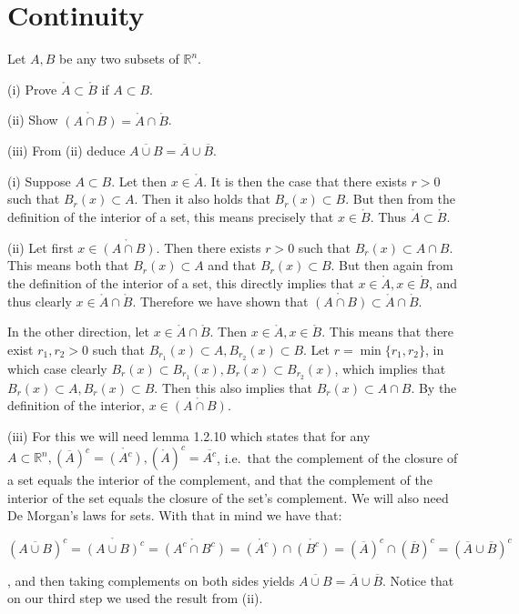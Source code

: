 \chapter{Continuity}

\begin{exercise}{6}
    Let $A, B$ be any two subsets of $\mathbb{R}^n$.

    (i) Prove $\mathring{A} \subset \mathring{B}$ if $A \subset B$.

    (ii) Show $\mathring{(A\cap B)} = \mathring{A} \cap \mathring{B}$.

    (iii) From (ii) deduce $\overline{A \cup B} = \overline{A} \cup \overline{B}$.
\end{exercise}

\begin{solution}

    (i) Suppose $A \subset B$. Let then $x \in \mathring{A}$. It is then the case that there exists $r > 0$ such that $B_r(x) \subset A$. Then it also holds that $B_r(x) \subset B$. But then from the definition of the interior of a set, this means precisely that $x \in \mathring{B}$. Thus $\mathring{A} \subset \mathring{B}$.

    (ii) Let first $x \in \mathring{(A\cap B)}$. Then there exists $r > 0$ such that $B_r(x) \subset A \cap B$. This means both that $B_r(x) \subset A$ and that $B_r(x) \subset B$. But then again from the definition of the interior of a set, this directly implies that $x \in \mathring{A}, x \in \mathring{B}$, and thus clearly $x \in \mathring{A} \cap \mathring{B}$. Therefore we have shown that $\mathring{(A \cap B)} \subset \mathring{A} \cap \mathring{B}$.

    In the other direction, let $x \in \mathring{A} \cap \mathring{B}$. Then $x \in \mathring{A}, x \in \mathring{B}$. This means that there exist $r_1, r_2 > 0$ such that $B_{r_1}(x) \subset A, B_{r_2}(x) \subset B$. Let $r = \min\{r_1, r_2\}$, in which case clearly $B_r(x) \subset B_{r_1}(x), B_r(x) \subset B_{r_2}(x)$, which implies that $B_r(x) \subset A, B_r(x) \subset B$. Then this also implies that $B_r(x) \subset A \cap B$. By the definition of the interior, $x \in \mathring{(A \cap B)}$.

    (iii) For this we will need lemma 1.2.10 which states that for any $A \subset \mathbb{R}^n, (\overline{A})^c = \mathring{(A^c)}, (\mathring{A})^c = \overline{A^c}$, i.e.\ that the complement of the closure of a set equals the interior of the complement, and that the complement of the interior of the set equals the closure of the set's complement. We will also need De Morgan's laws for sets. With that in mind we have that:
    
    $$(\overline{A\cup B})^c = \mathring{(A \cup B)^c} = \mathring{(A^c \cap B^c)} = \mathring{(A^c)} \cap \mathring{(B^c)} = (\overline{A})^c \cap (\overline{B})^c = (\overline{A} \cup \overline{B})^c$$

    , and then taking complements on both sides yields $\overline{A \cup B} = \overline{A} \cup \overline{B}$. Notice that on our third step we used the result from (ii).
\end{solution}

